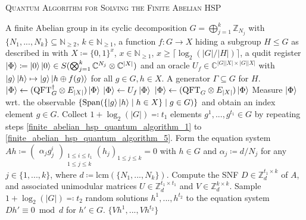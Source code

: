 \documentclass[10pt]{amsart}
\numberwithin{equation}{section}
\theoremstyle{definition}
\theoremstyle{remark}
\DeclareMathOperator{\Span}{Span}
\begin{document}
    {\centering\begin{minipage}{\linewidth}
        \vspace{-0.25cm}
        \begin{algorithm}[H]
            \caption{\textsc{Quantum Algorithm for Solving the Finite Abelian HSP}}
            \label{finite_abelian_hsp_quantum_algorithm}
            \begin{algorithmic}[1]
                \Require A finite Abelian group in its cyclic decomposition \(G = \bigoplus_{j=1}^k \mathbb{Z}_{N_j}\) with \(\{N_1, ..., N_k\} \subseteq \mathbb{N}_{\geq 2}\), \(k \in \mathbb{N}_{\geq 1}\), a function \(f\colon G \to X\) hiding a subgroup \(H \leq G\) as described in  with \(X \coloneqq \{0, 1\}^x\), \(x \in \mathbb{N}_{\geq 1}\), \(x \geq \lceil\log_2(|G|/|H|)\rceil\), a qudit register \(\ket{\Phi} \coloneqq \ket{0}\ket{0} \in S(\bigotimes_{j=1}^k \mathbb{C}^{N_j} \otimes \mathbb{C}^{|X|})\) and an oracle \(U_f \in \mathbb{C}^{|G||X| \times |G||X|}\) with \(\ket{g}\ket{h} \mapsto \ket{g}\ket{h \oplus f(g)}\) for all \(g \in G, h \in X\).
                \Ensure A generator \(\Gamma \subseteq G\) for \(H\).
                \State \(\ket{\Phi} \gets (\text{QFT}_G^\dagger \otimes E_{|X|}) \ket{\Phi}\) \label{finite_abelian_hsp_quantum_algorithm_1}
                \State \(\ket{\Phi} \gets U_f \ket{\Phi}\)
                \State \(\ket{\Phi} \gets (\text{QFT}_G \otimes E_{|X|}) \ket{\Phi}\)
                \State Measure \(\ket{\Phi}\) wrt. the observable \(\{\Span(\{\ket{g}\ket{h} \mid h \in X\} \mid g \in G)\}\) and obtain an index element \(g \in G\). \label{finite_abelian_hsp_quantum_algorithm_5}
                \State Collect \(1+\log_2(|G|) \eqqcolon t_1\) elements \(g^1, ..., g^{t_1} \in G\) by repeating steps \ref{finite_abelian_hsp_quantum_algorithm_1} to \ref{finite_abelian_hsp_quantum_algorithm_5}.
                \State Form the equation system \(Ah \coloneqq \begin{pmatrix}
                    \alpha_jg_j^i
                \end{pmatrix}_{\substack{1 \leq i \leq t_1\\1 \leq j \leq k}} (h_j)_{1 \leq j \leq k} = 0\) with \(h \in G\) and \(\alpha_j \coloneqq d/N_j\) for any \(j \in \{1, ..., k\}\), where \(d \coloneqq \text{lcm}(\{N_1, ..., N_k\})\). Compute the SNF \(D \in \mathbb{Z}_d^{t_1 \times k}\) of \(A\), and associated unimodular matrices \(U \in \mathbb{Z}_d^{t_1 \times t_1}\) and \(V \in \mathbb{Z}_d^{k \times k}\).
                \State Sample \(1+\log_2(|G|) \eqqcolon t_2\) random solutions \(h^1, ..., h^{t_2}\) to the equation system \(Dh' \equiv 0 \bmod d\) for \(h' \in G\).
                \State \Return \(\{Vh^1, ..., Vh^{t_2}\}\)
            \end{algorithmic}
        \end{algorithm}
    \end{minipage}\par}
\end{document}
